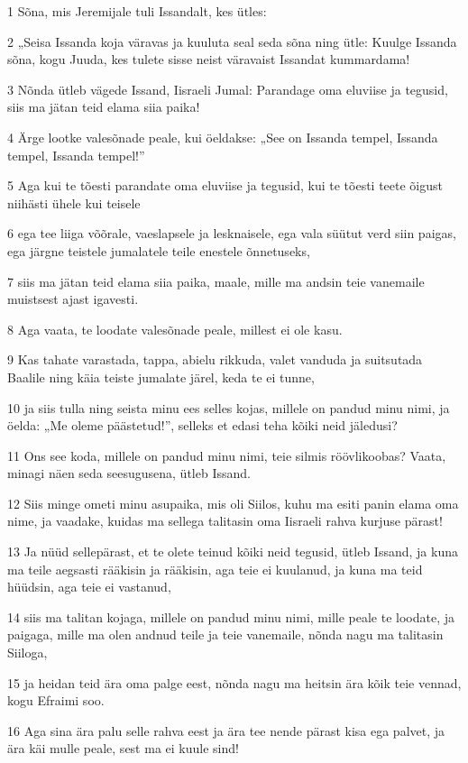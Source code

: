 \par 1 Sõna, mis Jeremijale tuli Issandalt, kes ütles:
\par 2 „Seisa Issanda koja väravas ja kuuluta seal seda sõna ning ütle: Kuulge Issanda sõna, kogu Juuda, kes tulete sisse neist väravaist Issandat kummardama!
\par 3 Nõnda ütleb vägede Issand, Iisraeli Jumal: Parandage oma eluviise ja tegusid, siis ma jätan teid elama siia paika!
\par 4 Ärge lootke valesõnade peale, kui öeldakse: „See on Issanda tempel, Issanda tempel, Issanda tempel!”
\par 5 Aga kui te tõesti parandate oma eluviise ja tegusid, kui te tõesti teete õigust niihästi ühele kui teisele
\par 6 ega tee liiga võõrale, vaeslapsele ja lesknaisele, ega vala süütut verd siin paigas, ega järgne teistele jumalatele teile enestele õnnetuseks,
\par 7 siis ma jätan teid elama siia paika, maale, mille ma andsin teie vanemaile muistsest ajast igavesti.
\par 8 Aga vaata, te loodate valesõnade peale, millest ei ole kasu.
\par 9 Kas tahate varastada, tappa, abielu rikkuda, valet vanduda ja suitsutada Baalile ning käia teiste jumalate järel, keda te ei tunne,
\par 10 ja siis tulla ning seista minu ees selles kojas, millele on pandud minu nimi, ja öelda: „Me oleme päästetud!”, selleks et edasi teha kõiki neid jäledusi?
\par 11 Ons see koda, millele on pandud minu nimi, teie silmis röövlikoobas? Vaata, minagi näen seda seesugusena, ütleb Issand.
\par 12 Siis minge ometi minu asupaika, mis oli Siilos, kuhu ma esiti panin elama oma nime, ja vaadake, kuidas ma sellega talitasin oma Iisraeli rahva kurjuse pärast!
\par 13 Ja nüüd sellepärast, et te olete teinud kõiki neid tegusid, ütleb Issand, ja kuna ma teile aegsasti rääkisin ja rääkisin, aga teie ei kuulanud, ja kuna ma teid hüüdsin, aga teie ei vastanud,
\par 14 siis ma talitan kojaga, millele on pandud minu nimi, mille peale te loodate, ja paigaga, mille ma olen andnud teile ja teie vanemaile, nõnda nagu ma talitasin Siiloga,
\par 15 ja heidan teid ära oma palge eest, nõnda nagu ma heitsin ära kõik teie vennad, kogu Efraimi soo.
\par 16 Aga sina ära palu selle rahva eest ja ära tee nende pärast kisa ega palvet, ja ära käi mulle peale, sest ma ei kuule sind!
